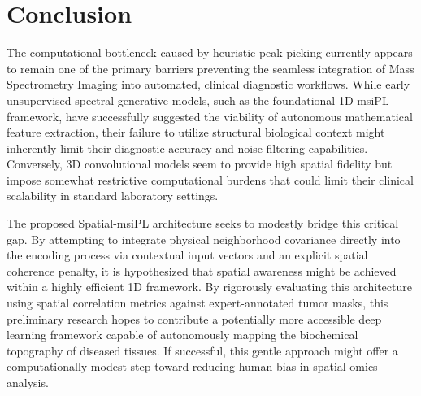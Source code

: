 \documentclass[
12pt, %
oneside, %
english, %
onehalfspacing, %
nolistspacing, %
headsepline, %
]{MastersDoctoralThesis} %
\begin{document}
\chapter{Conclusion}
The computational bottleneck caused by heuristic peak picking currently appears to remain one of the primary barriers preventing the seamless integration of Mass Spectrometry Imaging into automated, clinical diagnostic workflows. While early unsupervised spectral generative models, such as the foundational 1D msiPL framework, have successfully suggested the viability of autonomous mathematical feature extraction, their failure to utilize structural biological context might inherently limit their diagnostic accuracy and noise-filtering capabilities. Conversely, 3D convolutional models seem to provide high spatial fidelity but impose somewhat restrictive computational burdens that could limit their clinical scalability in standard laboratory settings.

The proposed Spatial-msiPL architecture seeks to modestly bridge this critical gap. By attempting to integrate physical neighborhood covariance directly into the encoding process via contextual input vectors and an explicit spatial coherence penalty, it is hypothesized that spatial awareness might be achieved within a highly efficient 1D framework. By rigorously evaluating this architecture using spatial correlation metrics against expert-annotated tumor masks, this preliminary research hopes to contribute a potentially more accessible deep learning framework capable of autonomously mapping the biochemical topography of diseased tissues. If successful, this gentle approach might offer a computationally modest step toward reducing human bias in spatial omics analysis.

\nocite{*}

\end{document}
